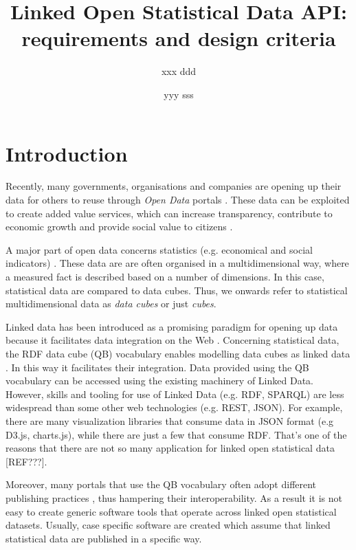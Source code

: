 \documentclass{llncs}
\begin{document}
\title{Linked Open Statistical Data API: requirements and design criteria}

\author{xxx ddd \and yyy sss}

\maketitle

\begin{abstract}

\end{abstract}

\section{Introduction}\label{sec:intro}

Recently, many governments, organisations and companies are opening up their data for others to reuse through \textit{Open Data} portals  \cite{Kalampokis:2011:IJWET}. These data can be exploited to create added value services, which can increase transparency, contribute to economic growth and provide social value to citizens \cite{Janssen:2012}.

A major part of open data concerns statistics (e.g. economical and social indicators) \cite{Capadisli:2013}. These data are are often organised in a multidimensional way, where a measured fact is described based on a number of dimensions. In this case, statistical data are compared to data cubes. Thus, we onwards refer to statistical multidimensional data as \textit{data cubes} or just \textit{cubes}.

Linked data has been introduced as a promising paradigm for opening up data because it facilitates data integration on the Web \cite{Bizer:2009}. Concerning statistical data, the RDF data cube (QB) vocabulary enables modelling data cubes as linked data \cite{Cyganiak:2014:W3C}. In this way it facilitates their integration. Data provided using the QB vocabulary can be accessed using the existing machinery of Linked Data. However, skills and tooling for use of Linked Data (e.g. RDF, SPARQL) are less widespread than some other web technologies (e.g. REST, JSON). For example, there are many visualization libraries that consume data in JSON format (e.g D3.js, charts.js), while there are just a few that consume RDF. That's one of the reasons that there are not so many application for linked open statistical data [REF???].

Moreover, many portals that use the QB vocabulary often adopt different publishing practices \cite{KalampokisChallenges}, thus hampering their interoperability. As a result it is not easy to create generic software tools that operate across linked open statistical datasets. Usually, case specific software are created which assume that linked statistical data are published in a specific way. 
\end{document}
